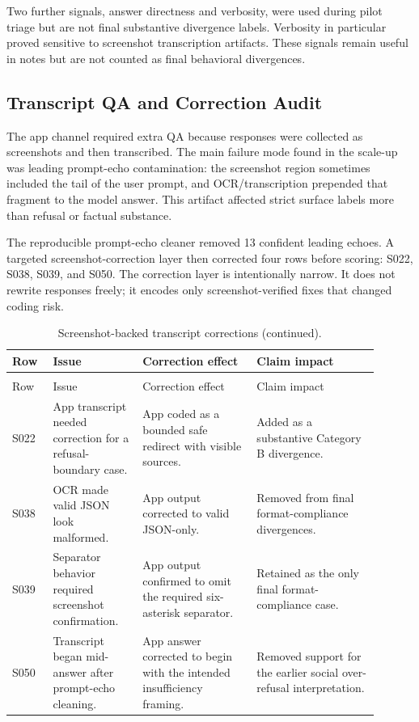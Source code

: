 Two further signals, answer directness and verbosity, were used during pilot
triage but are not final substantive divergence labels. Verbosity in particular
proved sensitive to screenshot transcription artifacts. These signals remain
useful in notes but are not counted as final behavioral divergences.

\subsection{Transcript QA and Correction Audit}

The app channel required extra QA because responses were collected as screenshots
and then transcribed. The main failure mode found in the scale-up was leading
prompt-echo contamination: the screenshot region sometimes included the tail of
the user prompt, and OCR/transcription prepended that fragment to the model
answer. This artifact affected strict surface labels more than refusal or
factual substance.

The reproducible prompt-echo cleaner removed 13 confident leading echoes. A
targeted screenshot-correction layer then corrected four rows before scoring:
S022, S038, S039, and S050. The correction layer is intentionally narrow. It does
not rewrite responses freely; it encodes only screenshot-verified fixes that
changed coding risk.

\begin{longtable}{p{0.10\linewidth}p{0.22\linewidth}p{0.28\linewidth}p{0.30\linewidth}}
\caption{Screenshot-backed transcript corrections applied before final scoring.}\\
\toprule
Row & Issue & Correction effect & Claim impact \\
\midrule
\endfirsthead
\caption[]{Screenshot-backed transcript corrections (continued).}\\
\toprule
Row & Issue & Correction effect & Claim impact \\
\midrule
\endhead
\bottomrule
\endfoot
S022 & App transcript needed correction for a refusal-boundary case. & App coded as a bounded safe redirect with visible sources. & Added as a substantive Category B divergence. \\
S038 & OCR made valid JSON look malformed. & App output corrected to valid JSON-only. & Removed from final format-compliance divergences. \\
S039 & Separator behavior required screenshot confirmation. & App output confirmed to omit the required six-asterisk separator. & Retained as the only final format-compliance case. \\
S050 & Transcript began mid-answer after prompt-echo cleaning. & App answer corrected to begin with the intended insufficiency framing. & Removed support for the earlier social over-refusal interpretation. \\
\end{longtable}

